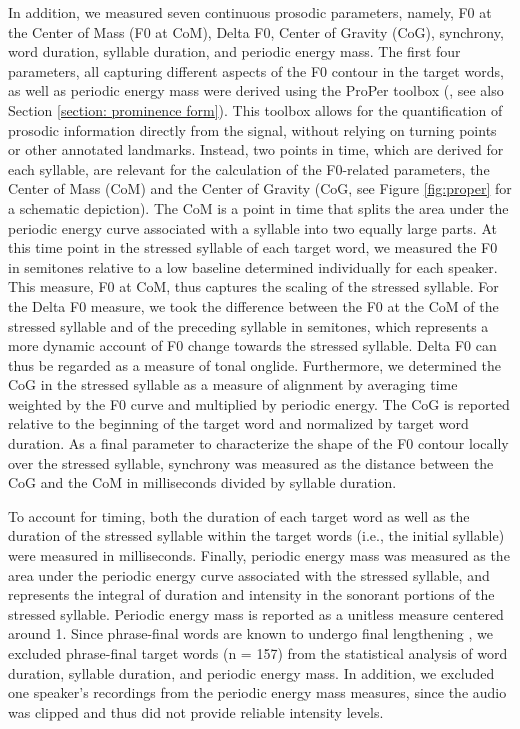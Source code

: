 In addition, we measured seven continuous prosodic parameters, namely, F0 at the Center of Mass (F0 at CoM), Delta F0, Center of Gravity (CoG), synchrony, word duration, syllable duration, and periodic energy mass. The first four parameters, all capturing different aspects of the F0 contour in the target words, as well as periodic energy mass were derived using the ProPer toolbox (\citealt{albertModelSonorityBased2023}, see also Section \ref{section: prominence form}). This toolbox allows for the quantification of prosodic information directly from the signal, without relying on turning points or other annotated landmarks. Instead, two points in time, which are derived for each syllable, are relevant for the calculation of the F0-related parameters, the Center of Mass (CoM) and the Center of Gravity (CoG, see Figure \ref{fig:proper} for a schematic depiction). The CoM is a point in time that splits the area under the periodic energy curve associated with a syllable into two equally large parts. At this time point in the stressed syllable of each target word, we measured the F0 in semitones relative to a low baseline determined individually for each speaker. This measure, F0 at CoM, thus captures the scaling of the stressed syllable. For the Delta F0 measure, we took the difference between the F0 at the CoM of the stressed syllable and of the preceding syllable in semitones, which represents a more dynamic account of F0 change towards the stressed syllable. Delta F0 can thus be regarded as a measure of tonal onglide. Furthermore, we determined the CoG in the stressed syllable as a measure of alignment by averaging time weighted by the F0 curve and multiplied by periodic energy. The CoG is reported relative to the beginning of the target word and normalized by target word duration. As a final parameter to characterize the shape of the F0 contour locally over the stressed syllable, synchrony was measured as the distance between the CoG and the CoM in milliseconds divided by syllable duration. 

To account for timing, both the duration of each target word as well as the duration of the stressed syllable within the target words (i.e., the initial syllable) were measured in milliseconds. Finally, periodic energy mass was measured as the area under the periodic energy curve associated with the stressed syllable, and represents the integral of duration and intensity in the sonorant portions of the stressed syllable. Periodic energy mass is reported as a unitless measure centered around 1. Since phrase-final words are known to undergo final lengthening \citep{wightmanSegmentalDurationsVicinity1992}, we excluded phrase-final target words (n = 157) from the statistical analysis of word duration, syllable duration, and periodic energy mass. In addition, we excluded one speaker's recordings from the periodic energy mass measures, since the audio was clipped and thus did not provide reliable intensity levels. 

